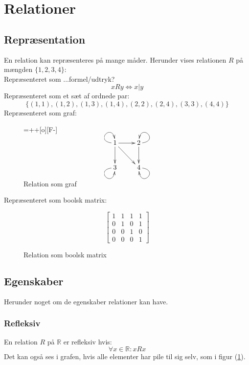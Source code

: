 \documentclass[a4paper]{article}
\begin{document}
\section{Relationer}

\subsection{Repræsentation}
 En relation kan repræsenteres på mange måder. Herunder vises relationen $R$ på mængden $\{ 1,2,3,4 \}$:\\
  Repræsenteret som ...formel/udtryk?
  \begin{equation}
    xRy \iff x | y
  \end{equation}
  Repræsenteret som et sæt af ordnede par:
  \begin{equation}
    \{ (1,1),(1,2),(1,3),(1,4),(2,2),(2,4),(3,3),(4,4) \}
  \end{equation}
  Repræsenteret som graf:
  \begin{figure}[H]
    \entrymodifiers={++[o][F-]}
    $$
    \xymatrix @-0pc {
      1 \ar@(l,u) \ar[r] \ar[d] \ar[dr] & 2 \ar@(r,u) \ar[d] \\
      3 \ar@(l,d) &  4 \ar@(r,d)}
      $$
    \caption{Relation som graf} \label{fig:xy1}
  \end{figure}
  Repræsenteret som boolsk matrix:
  \begin{figure}[H]
    $$
    \begin{bmatrix}
      1 & 1 & 1 & 1 \\
      0 & 1 & 0 & 1 \\
      0 & 0 & 1 & 0 \\
      0 & 0 & 0 & 1
    \end{bmatrix}
    $$
    \caption{Relation som boolsk matrix} \label{fig:bm1}
  \end{figure}
\subsection{Egenskaber}
  Herunder noget om de egenskaber relationer kan have.
  \subsubsection{Refleksiv}
    En relation $R$ på $\mathbb{R}$ er refleksiv hvis:
    \begin{equation}
      \forall x \in \mathbb{R}: xRx
    \end{equation}
    Det kan også ses i grafen, hvis alle elementer har pile til sig selv, som i figur (\ref{fig:xy1}).
\end{document}
